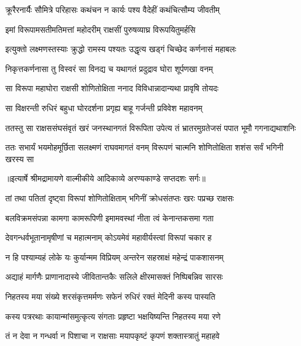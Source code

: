 \twolineshloka
{क्रूरैरनार्यैः सौमित्रे परिहासः कथंचन}
{न कार्यः पश्य वैदेहीं कथंचित्सौम्य जीवतीम्} %

\twolineshloka
{इमां विरूपामसतीमतिमत्तां महोदरीम्}
{राक्षसीं पुरुषव्याघ्र विरूपयितुमर्हसि} %

\twolineshloka
{इत्युक्तो लक्ष्मणस्तस्याः क्रुद्धो रामस्य पश्यतः}
{उद्धृत्य खड्गं चिच्छेद कर्णनासं महाबलः} %

\twolineshloka
{निकृत्तकर्णनासा तु विस्वरं सा विनद्य च}
{यथागतं प्रदुद्राव घोरा शूर्पणखा वनम्} %

\twolineshloka
{सा विरूपा महाघोरा राक्षसी शोणितोक्षिता}
{ननाद विविधान्नादान्यथा प्रावृषि तोयदः} %

\twolineshloka
{सा विक्षरन्ती रुधिरं बहुधा घोरदर्शना}
{प्रगृह्य बाहू गर्जन्ती प्रविवेश महावनम्} %

\fourlineindentedshloka
{ततस्तु सा राक्षससंघसंवृतं}
{ खरं जनस्थानगतं विरूपिता}
{उपेत्य तं भ्रातरमुग्रतेजसं}
{ पपात भूमौ गगनाद्यथाशनिः} %

\fourlineindentedshloka
{ततः सभार्यं भयमोहमूर्छिता}
{ सलक्ष्मणं राघवमागतं वनम्}
{विरूपणं चात्मनि शोणितोक्षिता}
{ शशंस सर्वं भगिनी खरस्य सा} %


{॥इत्यार्षे श्रीमद्रामायणे वाल्मीकीये आदिकाव्ये अरण्यकाण्डे सप्तदशः सर्गः॥}


\twolineshloka
{तां तथा पतितां दृष्ट्वा विरूपां शोणितोक्षिताम्}
{भगिनीं क्रोधसंतप्तः खरः पप्रच्छ राक्षसः} %

\twolineshloka
{बलविक्रमसंपन्ना कामगा कामरूपिणी}
{इमामवस्थां नीता त्वं केनान्तकसमा गता} %

\twolineshloka
{देवगन्धर्वभूतानामृषीणां च महात्मनाम्}
{कोऽयमेवं महावीर्यस्त्वां विरूपां चकार ह} %

\twolineshloka
{न हि पश्याम्यहं लोके यः कुर्यान्मम विप्रियम्}
{अन्तरेन सहस्राक्षं महेन्द्रं पाकशासनम्} %

\twolineshloka
{अद्याहं मार्गणैः प्राणानादास्ये जीवितान्तकैः}
{सलिले क्षीरमासक्तं निष्पिबन्निव सारसः} %

\twolineshloka
{निहतस्य मया संख्ये शरसंकृत्तमर्मणः}
{सफेनं रुधिरं रक्तं मेदिनी कस्य पास्यति} %

\twolineshloka
{कस्य पत्ररथाः कायान्मांसमुत्कृत्य संगताः}
{प्रहृष्टा भक्षयिष्यन्ति निहतस्य मया रणे} %

\twolineshloka
{तं न देवा न गन्धर्वा न पिशाचा न राक्षसाः}
{मयापकृष्टं कृपणं शक्तास्त्रातुं महाहवे} %

